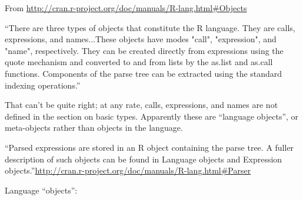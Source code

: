 From \url{http://cran.r-project.org/doc/manuals/R-lang.html#Objects}

``There are three types of objects that constitute the R
language. They are calls, expressions, and
names...These objects have modes "call", "expression", and "name",
respectively.  They can be created directly from expressions using the
quote mechanism and converted to and from lists by the as.list and
as.call functions. Components of the parse tree can be extracted using
the standard indexing operations.''

That can't be quite right; at any rate, calls, expressions, and names
are not defined in the section on basic types.  Apparently these are
``language objects'', or meta-objects rather than objects in the language.

``Parsed expressions are stored in an R object containing the parse
tree. A fuller description of such objects can be found in Language
objects and Expression
objects.''\url{http://cran.r-project.org/doc/manuals/R-lang.html#Parser}


\medskip
\noindent Language ``objects'':

